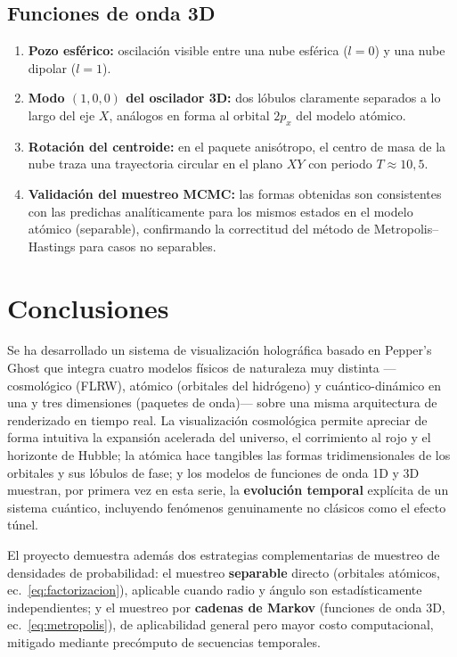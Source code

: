 \documentclass[12pt, a4paper]{article}
\begin{document}
\subsection{Funciones de onda 3D}

\begin{enumerate}
  \item \textbf{Pozo esférico:} oscilación visible entre una nube
        esférica ($l=0$) y una nube dipolar ($l=1$).
  \item \textbf{Modo $(1,0,0)$ del oscilador 3D:} dos lóbulos
        claramente separados a lo largo del eje $X$, análogos en
        forma al orbital $2p_x$ del modelo atómico.
  \item \textbf{Rotación del centroide:} en el paquete anisótropo, el
        centro de masa de la nube traza una trayectoria circular en
        el plano $XY$ con periodo $T\approx10{,}5$.
  \item \textbf{Validación del muestreo MCMC:} las formas obtenidas
        son consistentes con las predichas analíticamente para los
        mismos estados en el modelo atómico (separable), confirmando
        la correctitud del método de Metropolis--Hastings para casos
        no separables.
\end{enumerate}

\section{Conclusiones}

Se ha desarrollado un sistema de visualización holográfica basado en
Pepper's Ghost que integra cuatro modelos físicos de naturaleza muy
distinta —cosmológico (FLRW), atómico (orbitales del hidrógeno) y
cuántico-dinámico en una y tres dimensiones (paquetes de onda)— sobre
una misma arquitectura de renderizado en tiempo real. La visualización
cosmológica permite apreciar de forma intuitiva la expansión acelerada
del universo, el corrimiento al rojo y el horizonte de Hubble; la
atómica hace tangibles las formas tridimensionales de los orbitales y
sus lóbulos de fase; y los modelos de funciones de onda 1D y 3D
muestran, por primera vez en esta serie, la \textbf{evolución
temporal} explícita de un sistema cuántico, incluyendo fenómenos
genuinamente no clásicos como el efecto túnel.

El proyecto demuestra además dos estrategias complementarias de
muestreo de densidades de probabilidad: el muestreo \textbf{separable}
directo (orbitales atómicos, ec.~\ref{eq:factorizacion}), aplicable
cuando radio y ángulo son estadísticamente independientes; y el
muestreo por \textbf{cadenas de Markov} (funciones de onda 3D,
ec.~\ref{eq:metropolis}), de aplicabilidad general pero mayor costo
computacional, mitigado mediante precómputo de secuencias temporales.
\end{document}
